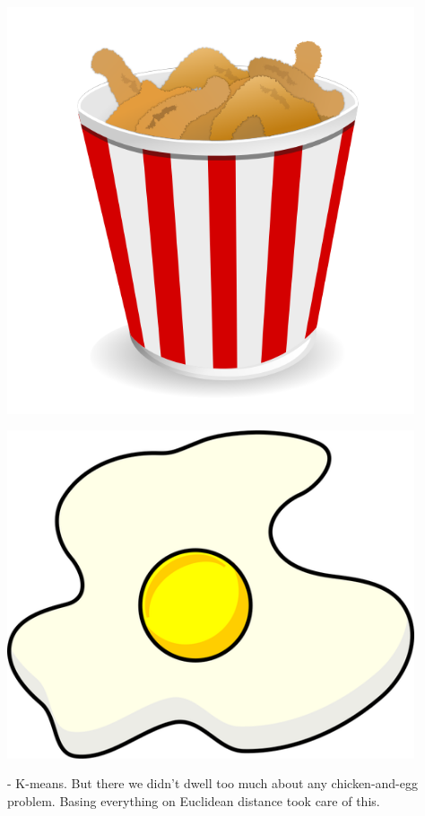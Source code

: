 \begin{frame}{\subsecname}
\begin{center}
\begin{minipage}{0.1\textwidth}
\begin{center}
	\includegraphics[width=0.9\textwidth]{img/fried-chicken}
\end{center}
\end{minipage}
\begin{minipage}{0.1\textwidth}
\begin{center}
	\includegraphics[width=0.9\textwidth]{img/fried-egg}
\end{center}
\end{minipage}
\end{center}

\pause


- K-means. But there we didn't dwell too much about any chicken-and-egg problem. Basing everything on Euclidean distance took care of this.


\end{frame}

